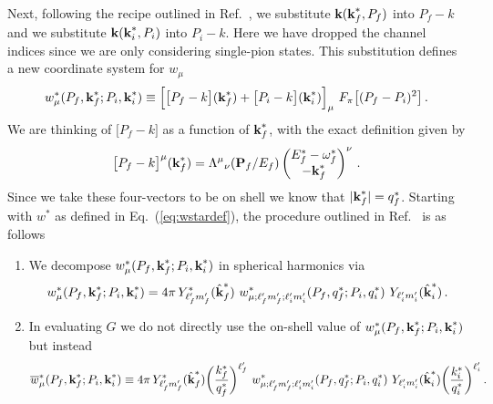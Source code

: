 Next, following the recipe outlined in Ref.~\cite{BH2to2}, we substitute $\textbf k(\textbf k_{f}^*, P_f)$ into $P_f - k$ and we substitute $\textbf k(\textbf k_{i}^*, P_i)$ into $P_i - k$. Here we have dropped the channel indices since we are only considering single-pion states. This substitution defines a new coordinate system for $w_\mu$
\begin{equation}
\label{eq:wstardef}
w^*_\mu(P_f ,\textbf k_{f}^* ; P_i , \textbf k_{i}^*) \equiv \Big [ \big [ P_f - k\big ](\textbf k_{f}^*) + \big [P_i - k \big ](\textbf k_{i}^*) \Big ]_\mu \  F_\pi \big [(P_f - P_i)^2 \big ] \,.
\end{equation}
We are thinking of $ \big [ P_f - k\big ]$ as a function of $\textbf k_{f}^*$, with the exact definition given by 
\begin{equation}
\big [ P_f - k\big ]^\mu(\textbf k_{f}^*) = { \Lambda^{\mu}}_{\nu}(\textbf P_f /E_f) \begin{pmatrix} E^*_f - \omega_{f}^* \\ - \textbf k_{f}^*  \end{pmatrix}^{\nu} \,.
\end{equation}
Since we take these four-vectors to be on shell we know that $\vert \textbf k^*_f \vert = q^*_f$. Starting with $w^*$ as defined in Eq.~(\ref{eq:wstardef}), the procedure outlined in Ref.~\cite{BH2to2} is as follows
\begin{enumerate}
\item We decompose $w^*_\mu(P_f ,\textbf k_{f}^* ; P_i , \textbf k_{i}^*)$ in spherical harmonics via
\begin{equation}
w^*_\mu(P_f ,\textbf k_{f}^* ; P_i , \textbf k_{i}^*) = 4 \pi \, Y^*_{\ell_f' m_f'}(\hat {\textbf k}_{f}^*) \  w^*_{\mu; \ell_f' m_f'; \ell_i' m_i'}(P_f , q_{f}^* ; P_i ,  q_{i}^*) \  Y_{\ell_i' m_i'}(\hat {\textbf k}_{i}^*) \,.
\end{equation}
\item In evaluating $G$ we do not directly use the on-shell value of $w^*_\mu(P_f ,\textbf k_{f}^* ; P_i , \textbf k_{i}^*) $ but instead 
\begin{equation}
\label{eq:wbardef}
\overline w^*_\mu(P_f ,\textbf k_{f}^* ; P_i , \textbf k_{i}^*) \equiv 4 \pi \, Y^*_{\ell_f' m_f'}(\hat {\textbf k}_{f}^*) \bigg ( \frac{k^*_f}{q^*_f} \bigg )^{\ell_f'} \  w^*_{\mu; \ell_f' m_f'; \ell_i' m_i'}(P_f , q_{f}^* ; P_i ,  q_{i}^*) \  Y_{\ell_i' m_i'}(\hat {\textbf k}_{i}^*) \bigg ( \frac{k^*_i}{q^*_i} \bigg )^{\ell_i'} \,.
\end{equation}
\end{enumerate}
{\mh [Suppose $w^* = C ( \hat {\textbf k^*_i}_x^2 + \hat {\textbf k^*_f}_x^2) $, then what is the value of $\overline w^*$?]}

